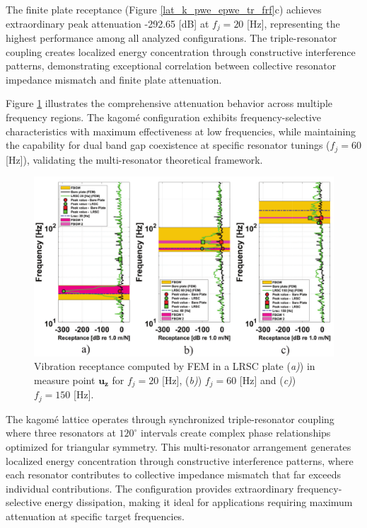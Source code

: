 \documentclass[review,numbers,sort&compress]{elsarticle}
\begin{document}
The finite plate receptance (Figure \ref{lat_k_pwe_epwe_tr_frf}c) achieves extraordinary peak attenuation -292.65 [dB] at $f_j = 20$ [Hz], representing the highest performance among all analyzed configurations. The triple-resonator coupling creates localized energy concentration through constructive interference patterns, demonstrating exceptional correlation between collective resonator impedance mismatch and finite plate attenuation.

Figure \ref{lat_k_tr_frf_f1_f2_f3} illustrates the comprehensive attenuation behavior across multiple frequency regions. The kagomé configuration exhibits frequency-selective characteristics with maximum effectiveness at low frequencies, while maintaining the capability for dual band gap coexistence at specific resonator tunings ($f_j = 60$ [Hz]), validating the multi-resonator theoretical framework.

\begin{figure}[htb]
	\centering
	\includegraphics[width=1.0\textwidth]{2_5_disp_frf_kag_3_receps.pdf}
	\caption{Vibration receptance computed by FEM in a LRSC plate (\textit{a)}) in measure point $\mathbf{u_z}$  for $f_j = 20$ [Hz], (\textit{b)}) $f_j = 60$ [Hz] and (\textit{c)}) $f_j = 150$ [Hz].}
	\label{lat_k_tr_frf_f1_f2_f3}
\end{figure}

The kagomé lattice operates through synchronized triple-resonator coupling where three resonators at $120^\circ$ intervals create complex phase relationships optimized for triangular symmetry. This multi-resonator arrangement generates localized energy concentration through constructive interference patterns, where each resonator contributes to collective impedance mismatch that far exceeds individual contributions. The configuration provides extraordinary frequency-selective energy dissipation, making it ideal for applications requiring maximum attenuation at specific target frequencies.
\end{document}
